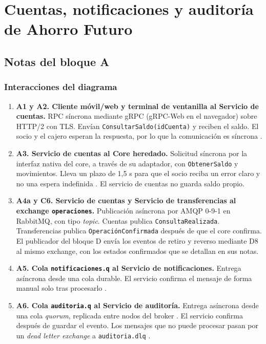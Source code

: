 \documentclass[12pt,a4paper]{article}
\begin{document}
\section{Cuentas, notificaciones y auditoría de Ahorro Futuro}

\subsection{Notas del bloque A}

\subsubsection{Interacciones del diagrama}

\begin{enumerate}
    \item \textbf{A1 y A2. Cliente móvil/web y terminal de ventanilla al Servicio de cuentas.}
    RPC síncrona mediante gRPC (gRPC-Web en el navegador) sobre HTTP/2 con TLS. Envían \texttt{ConsultarSaldo(idCuenta)} y reciben el saldo. El socio y el cajero esperan la respuesta, por lo que la comunicación es síncrona \cite{birrell1984}.

    \item \textbf{A3. Servicio de cuentas al Core heredado.}
    Solicitud síncrona por la interfaz nativa del core, a través de su adaptador, con \texttt{ObtenerSaldo} y movimientos. Lleva un plazo de 1,5 s para que el socio reciba un error claro y no una espera indefinida \cite{grpcdeadlines}. El servicio de cuentas no guarda saldo propio.

    \item \textbf{A4a y C6. Servicio de cuentas y Servicio de transferencias al exchange \texttt{operaciones}.}
    Publicación asíncrona por AMQP 0-9-1 en RabbitMQ, con tipo \textit{topic}. Cuentas publica \texttt{ConsultaRealizada}. Transferencias publica \texttt{OperaciónConfirmada} después de que el core confirma. El publicador del bloque D envía los eventos de retiro y reverso mediante D8 al mismo exchange, con los estados confirmados que se detallan en sus notas.

    \item \textbf{A5. Cola \texttt{notificaciones.q} al Servicio de notificaciones.}
    Entrega asíncrona desde una cola durable. El servicio confirma el mensaje de forma manual solo tras procesarlo \cite{rabbitmqconfirms}.

    \item \textbf{A6. Cola \texttt{auditoria.q} al Servicio de auditoría.}
    Entrega asíncrona desde una cola \textit{quorum}, replicada entre nodos del broker \cite{rabbitmqquorum}. El servicio confirma después de guardar el evento. Los mensajes que no puede procesar pasan por un \textit{dead letter exchange} a \texttt{auditoria.dlq} \cite{rabbitmqdlx}.


\end{enumerate}
\end{document}
